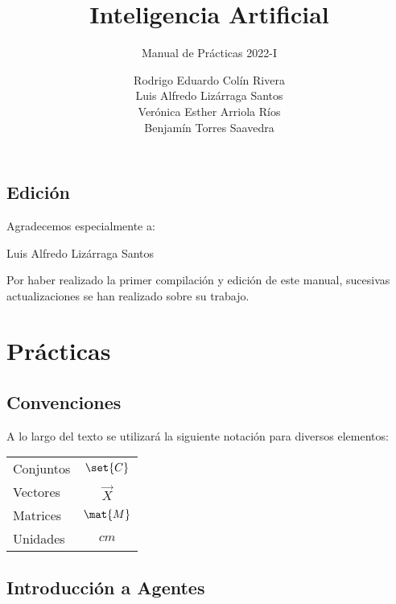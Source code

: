 \documentclass[12pt,openany]{book}
\title{Inteligencia Artificial}
\subtitle{Manual de Prácticas 2022-I}
\author{
  Rodrigo Eduardo Colín Rivera \\
  Luis Alfredo Lizárraga Santos \\
  Verónica Esther Arriola Ríos \\
  Benjamín Torres Saavedra \\
}
\begin{document}
\maketitle

\chapter*{Edición}


Agradecemos especialmente a:

\begin{center}
 Luis Alfredo Lizárraga Santos
\end{center}
 
Por haber realizado la primer compilación y edición de este manual, sucesivas actualizaciones se han realizado sobre su trabajo.



\frontmatter %
\tableofcontents
\clearemptydoublepage %


\mainmatter  %



\part{Prácticas}


\chapter*{Convenciones}

A lo largo del texto se utilizará la siguiente notación para diversos elementos:
\begin{longtable}{lc}
 Conjuntos   &   $\set{C}$ \\
 Vectores    &   $\vec{X}$ \\
 Matrices    &   $\mat{M}$ \\
 Unidades    &   $\unit{cm}$
\end{longtable}



\chapter{Introducción a Agentes}
\end{document}
